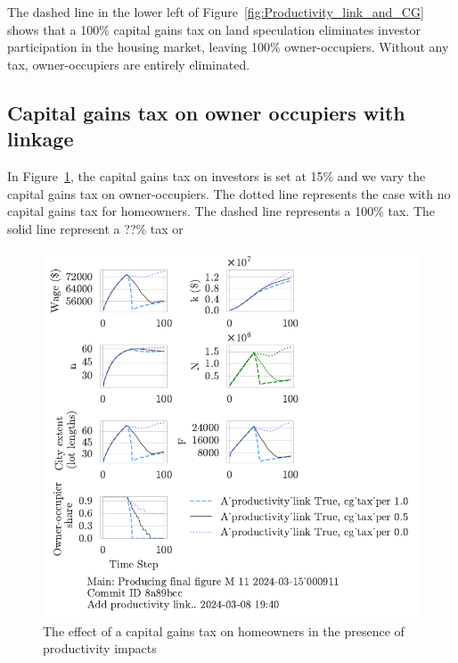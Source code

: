 {The dashed line in the lower left of Figure~\ref{fig:Productivity_link_and_CG} shows that a 100\% capital gains tax on land speculation eliminates investor participation in the housing market, leaving  100\%  owner-occupiers.  Without any tax, owner-occupiers are entirely eliminated.  



\subsection{Capital gains tax on owner occupiers  with linkage}


In Figure~\ref{fig:Productivity_link_and_CGpers_ownership_trajectory}, the capital gains tax on investors is set at 15\% and we vary the capital gains tax on owner-occupiers. The dotted line represents the case with no capital gains tax for homeowners.  The dashed line represents a 100\% tax. {\color{red} The solid line represent a ??\% tax or}
\begin{figure}[h!b]
    \centering
    \includegraphics[scale=1, trim={0 1.4cm 0 0},clip]{fig/With-productivity_link_cg_tax_per-000911.pdf}
    \caption{The effect of a capital gains tax on homeowners in the presence of productivity impacts}
    \label{fig:Productivity_link_and_CGpers_ownership_trajectory}
\end{figure}

}
